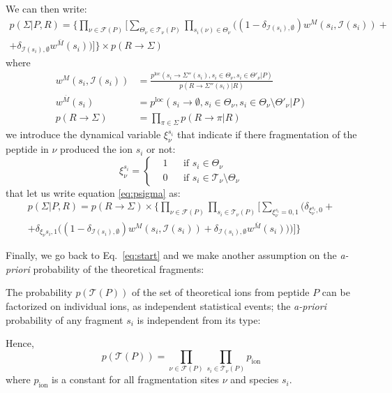 We can then write:
\begin{multline}
p(\Sigma|P,R)=
\Bigg\{\prod_{\nu\in\mathcal F(P)}
\Bigg[\sum_{\Theta_\nu\in\mathcal T_\nu(P)}
\prod_{s_i(\nu)\in\Theta_\nu}\Big(
(1-\delta_{\mathcal I(s_i),\emptyset})w^M(s_i,\mathcal I(s_i))+\\
+\delta_{\mathcal I(s_i),\emptyset}w^{\bar M}(s_i)
\Big)\Bigg]\Bigg\}\times
p(R\to\Sigma)
\label{eq:psigma}
\end{multline}
where
\begin{align}
w^M(s_i,\mathcal I(s_i))&=
\frac{p^\text{loc}(s_i\to\Sigma''(s_i),s_i\in\Theta_\nu,s_i\in\Theta'_\nu|P)}
{p(R\to\Sigma''(s_i)|R)}\\
w^{\overline M}(s_i)&=
p^\text{loc}(s_i\to\emptyset,s_i\in\Theta_\nu,s_i\in\Theta_\nu\setminus\Theta'_\nu|P)\\
p(R\to\Sigma)&=
\prod_{\pi\in\Sigma} p(R\to\pi|R)
\label{eq:wM}
\end{align}
we introduce the dynamical variable $\xi_\nu^{s_i}$ that indicate if there
fragmentation of the peptide in $\nu$ produced the ion $s_i$ or not:
\begin{equation}
\xi_\nu^{s_i}=\left\{
\begin{aligned}
&1 && \text{if\ } s_i\in\Theta_\nu\\
&0 && \text{if\ } s_i\in\mathcal T_\nu\setminus\Theta_\nu
\end{aligned}
\right.
\end{equation}
that let us write equation \ref{eq:psigma} as:
\begin{multline}
p(\Sigma|P,R)=
p(R\to\Sigma)\times
\Bigg\{\prod_{\nu\in\mathcal F(P)}
\prod_{s_i\in\mathcal T_\nu(P)}\Bigg[
\sum_{\xi_\nu^{s_i}=0,1} \Bigg( 
\delta_{\xi_\nu^{s_i},0}+ \\
+\delta_{\xi_\nu{s_i},1}\Big(
(1-\delta_{\mathcal I(s_i),\emptyset})w^M(s_i,\mathcal I(s_i))
+\delta_{\mathcal I(s_i),\emptyset}w^{\bar M}(s_i)
\Big)
\Bigg)
\Bigg]\Bigg\}
\end{multline}

Finally, we go back to Eq.~\ref{eq:start} and we make another assumption on the
\emph{a-priori} probability of the theoretical fragments:
\begin{hypothesis}
The probability $p(\mathcal T(P))$ of the set of theoretical ions from peptide
$P$ can be factorized on individual ions, as independent statistical events; the
\emph{a-priori} probability of any fragment $s_i$  is independent from its type:
\end{hypothesis}
Hence,
\begin{equation}
p(\mathcal T(P))=\prod_{\nu\in\mathcal F(P)}
\prod_{s_i\in\mathcal T_\nu(P)} p_\text{ion}
\end{equation}
where $p_\text{ion}$ is a constant for all fragmentation sites $\nu$ and species
$s_i$.


